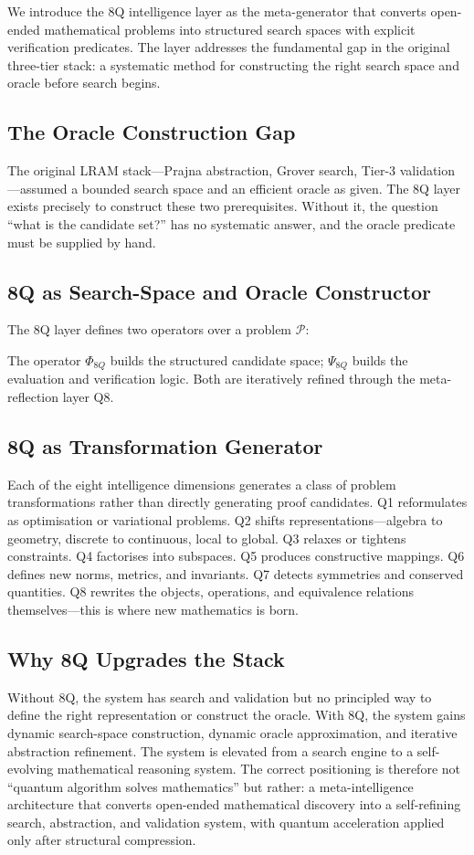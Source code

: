 We introduce the 8Q intelligence layer as the meta-generator that converts open-ended mathematical problems into structured search spaces with explicit verification predicates. The layer addresses the fundamental gap in the original three-tier stack: a systematic method for constructing the right search space and oracle before search begins.

\subsection{The Oracle Construction Gap}


The original LRAM stack---Prajna abstraction, Grover search, Tier-3 validation---assumed a bounded search space and an efficient oracle as given. The 8Q layer exists precisely to construct these two prerequisites. Without it, the question ``what is the candidate set?'' has no systematic answer, and the oracle predicate must be supplied by hand.

\subsection{8Q as Search-Space and Oracle Constructor}
The 8Q layer defines two operators over a problem $\mathcal{P}$:


The operator $\Phi_{8Q}$ builds the structured candidate space; $\Psi_{8Q}$ builds the evaluation and verification logic. Both are iteratively refined through the meta-reflection layer Q8.

\subsection{8Q as Transformation Generator}
Each of the eight intelligence dimensions generates a class of problem transformations rather than directly generating proof candidates. Q1 reformulates as optimisation or variational problems. Q2 shifts representations---algebra to geometry, discrete to continuous, local to global. Q3 relaxes or tightens constraints. Q4 factorises into subspaces. Q5 produces constructive mappings. Q6 defines new norms, metrics, and invariants. Q7 detects symmetries and conserved quantities. Q8 rewrites the objects, operations, and equivalence relations themselves---this is where new mathematics is born.

\subsection{Why 8Q Upgrades the Stack}
Without 8Q, the system has search and validation but no principled way to define the right representation or construct the oracle. With 8Q, the system gains dynamic search-space construction, dynamic oracle approximation, and iterative abstraction refinement. The system is elevated from a search engine to a self-evolving mathematical reasoning system. The correct positioning is therefore not ``quantum algorithm solves mathematics'' but rather: a meta-intelligence architecture that converts open-ended mathematical discovery into a self-refining search, abstraction, and validation system, with quantum acceleration applied only after structural compression.
